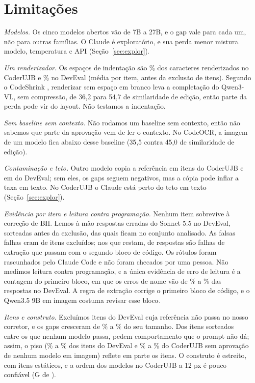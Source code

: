 \section{Limitações}
\label{sec:limit}
\textit{Modelos.} Os cinco modelos abertos vão de 7B a 27B, e o gap vale para cada um, não para outras famílias. O Claude é exploratório, e sua perda menor mistura modelo, temperatura e API (Seção~\ref{sec:explor}).

\textit{Um renderizador.} Os espaços de indentação são \indentShareUjb{}\% dos caracteres renderizados no CoderUJB e \indentShareDev{}\% no DevEval (média por item, antes da exclusão de itens). Segundo o CodeShrink \citep{tang2026codeshrink}, renderizar sem espaço em branco leva a completação do Qwen3-VL, sem compressão, de 36,2 para 54,7 de similaridade de edição, então parte da perda pode vir do layout. Não testamos a indentação.

\textit{Sem baseline sem contexto.} Não rodamos um baseline sem contexto, então não sabemos que parte da aprovação vem de ler o contexto. No CodeOCR, a imagem de um modelo fica abaixo desse baseline (35,5 contra 45,0 de similaridade de edição).

\textit{Contaminação e teto.} Outro modelo copia a referência em \copiedItemsUjb itens do CoderUJB e em \copiedItemsDev do DevEval; sem eles, os \contamGaps{} gaps seguem negativos, mas a cópia pode inflar a taxa em texto. No CoderUJB o Claude está perto do teto em texto (Seção~\ref{sec:explor}).

\textit{Evidência por item e leitura contra programação.} Nenhum item sobrevive à correção de BH. Lemos à mão \handReadAnswers respostas erradas do Sonnet 5.5 no DevEval, sorteadas antes da exclusão, das quais \handReadKept ficam no conjunto analisado. As \handReadFalseFails falsas falhas eram de itens excluídos; nos que restam, \handReadFalseFailsKept de \handReadKept respostas são falhas de extração que passam com o segundo bloco de código. Os rótulos foram rascunhados pelo Claude Code e não foram checados por uma pessoa.
Não medimos leitura contra programação, e a única evidência de erro de leitura é a contagem do primeiro bloco, em que os erros de nome vão de \nameDevText{}\% a \nameDevImage{}\% das respostas no DevEval.
A regra de extração corrige o primeiro bloco de código, e o Qwen3.5 9B em imagem costuma revisar esse bloco.

\textit{Itens e construto.} Excluímos \excludedDev itens do DevEval cuja referência não passa no nosso corretor, e os gaps cresceram de \gapGrowthLo{}\% a \gapGrowthHi{}\% do seu tamanho. Dos \underspecifiedOf itens sorteados entre os que nenhum modelo passa, \underspecifiedItems pedem comportamento que o prompt não dá; assim, o piso (\floorImageMinDev{}\% a \floorImageMaxDev{}\% dos itens do DevEval e \floorImageMinUjb{}\% a \floorImageMaxUjb{}\% do CoderUJB sem aprovação de nenhum modelo em imagem) reflete em parte os itens. O construto é estreito, com itens estáticos, e a ordem dos modelos no CoderUJB a 12 px é pouco confiável (G de \gFiniteTwelveUjb).
